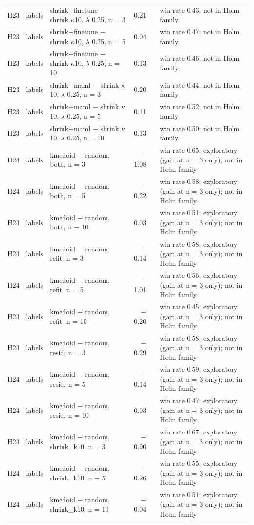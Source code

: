 \begin{tabular}{lllrrl}
H23 & labels & shrink+finetune $-$ shrink $\kappa$10, $\lambda$ 0.25, n = 3 & 0.21 &  & win rate 0.43; not in Holm family \\
H23 & labels & shrink+finetune $-$ shrink $\kappa$10, $\lambda$ 0.25, n = 5 & 0.04 &  & win rate 0.47; not in Holm family \\
H23 & labels & shrink+finetune $-$ shrink $\kappa$10, $\lambda$ 0.25, n = 10 & 0.13 &  & win rate 0.46; not in Holm family \\
H23 & labels & shrink+maml $-$ shrink $\kappa$10, $\lambda$ 0.25, n = 3 & 0.20 &  & win rate 0.44; not in Holm family \\
H23 & labels & shrink+maml $-$ shrink $\kappa$10, $\lambda$ 0.25, n = 5 & 0.11 &  & win rate 0.52; not in Holm family \\
H23 & labels & shrink+maml $-$ shrink $\kappa$10, $\lambda$ 0.25, n = 10 & 0.13 &  & win rate 0.50; not in Holm family \\
H24 & labels & kmedoid $-$ random, both, n = 3 & $-$1.08 &  & win rate 0.65; exploratory (gain at n = 3 only); not in Holm family \\
H24 & labels & kmedoid $-$ random, both, n = 5 & $-$0.22 &  & win rate 0.58; exploratory (gain at n = 3 only); not in Holm family \\
H24 & labels & kmedoid $-$ random, both, n = 10 & 0.03 &  & win rate 0.51; exploratory (gain at n = 3 only); not in Holm family \\
H24 & labels & kmedoid $-$ random, refit, n = 3 & $-$0.14 &  & win rate 0.58; exploratory (gain at n = 3 only); not in Holm family \\
H24 & labels & kmedoid $-$ random, refit, n = 5 & $-$1.01 &  & win rate 0.56; exploratory (gain at n = 3 only); not in Holm family \\
H24 & labels & kmedoid $-$ random, refit, n = 10 & $-$0.20 &  & win rate 0.45; exploratory (gain at n = 3 only); not in Holm family \\
H24 & labels & kmedoid $-$ random, resid, n = 3 & $-$0.29 &  & win rate 0.58; exploratory (gain at n = 3 only); not in Holm family \\
H24 & labels & kmedoid $-$ random, resid, n = 5 & $-$0.14 &  & win rate 0.59; exploratory (gain at n = 3 only); not in Holm family \\
H24 & labels & kmedoid $-$ random, resid, n = 10 & 0.03 &  & win rate 0.47; exploratory (gain at n = 3 only); not in Holm family \\
H24 & labels & kmedoid $-$ random, shrink\_k10, n = 3 & $-$0.90 &  & win rate 0.67; exploratory (gain at n = 3 only); not in Holm family \\
H24 & labels & kmedoid $-$ random, shrink\_k10, n = 5 & $-$0.26 &  & win rate 0.55; exploratory (gain at n = 3 only); not in Holm family \\
H24 & labels & kmedoid $-$ random, shrink\_k10, n = 10 & $-$0.04 &  & win rate 0.51; exploratory (gain at n = 3 only); not in Holm family \\
\bottomrule
\end{tabular}
